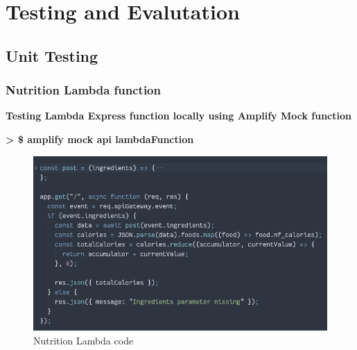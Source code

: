 %
%
\chapter{Testing and Evalutation}%
%
\label{chapter:testing_and_evaluation}

\section{Unit Testing} 

\subsection{Nutrition Lambda function} 

\textbf{Testing Lambda Express function locally using Amplify Mock function}

\textbf{> \$ amplify mock api lambdaFunction}

\begin{figure}[!hb]
\centering
\caption[Nutrition Lambda code]{Nutrition Lambda code}%
\label{fig:nutrition_lambda_code}
\includegraphics[width=\linewidth,height=\textheight,keepaspectratio]{img/nutrition_lambda_code}
\end{figure}

\clearpage

